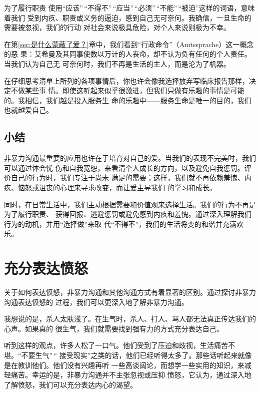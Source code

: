\documentclass{ctexart}
\newcounter{edesc}
\newcommand{\secref}[1]{第\ref{#1}章}
\begin{document}
\begin{edesc}
	\item[为了履行职责]
	使用``应该''\,``不得不''\,``应当''\,``必须''\,``不能''\,``被迫''这样的词语，意味着我们
	受到内疚、职责或义务的逼迫，感到自己无可奈何。我确信，一旦生命的需要被忽视，我们的行动
	对社会来说极具危险，对个人来说则极为不幸。

	在\secref{sec:是什么蒙蔽了爱？}中，我们看到``行政命令''（Amtssprache）这一概念的恶
	果：艾希曼及其同事使数以万计的人丧命，却不认为负有任何的个人责任。当我们认为自己无
	可奈何时，我们不再是生活的主人，而是沦为了机器。

	在仔细思考清单上所列的各项事情后，你也许会像我选择放弃写临床报告那样，决定不做某些事
	情。即使这听起来似乎很激进，但我们只做有乐趣的事情是可能的。我相信，我们越是投入服务生
	命的乐趣中------服务生命是唯一的目的，我们也就越爱自己。
\end{edesc}


\subsection{小结}

非暴力沟通最重要的应用也许在于培育对自己的爱。当我们的表现不完美时，我们可以通过体会忧
伤和自我宽恕，来看清个人成长的方向，以及避免自我惩罚。评价自己的行为时，我们专注于尚未
满足的需要；这样，我们就不再依赖羞愧、内疚、恼怒或沮丧的心理来寻求改变，而让爱主导我们
的学习和成长。

同时，在日常生活中，我们主动根据需要和价值观来选择生活。我们的行为不再是为了履行职责、
获得回报、逃避惩罚或避免感到内疚和羞愧。通过深入理解我们行为的动机，并用``选择做''来取
代``不得不''，我们的生活将变的和谐并充满欢乐。


\section{充分表达愤怒}\label{sec:充分表达愤怒}

关于如何表达愤怒，非暴力沟通和其他沟通方式有着显著的区别。通过探讨非暴力沟通表达愤怒的
过程，我们可以更深入地了解非暴力沟通。

我想说的是，杀人太肤浅了。在生气时，杀人、打人、骂人都无法真正传达我们的心声。如果真的
很生气，我们就需要找到强有力的方式充分表达自己。

听到这样的观点，许多人松了一口气。他们受到了压迫和歧视，生活痛苦不堪。``不要生气''\,``
接受现实''之类的话，他们已经听得太多了。那些话听起来就像是在教训他们。他们没有兴趣再听
一些高谈阔论，而想学一些实用的知识，来减轻痛苦。幸运的是，非暴力沟通并不主张忽视或压抑
愤怒，它认为，通过深入地了解愤怒，我们可以充分表达内心的渴望。
\end{document}
